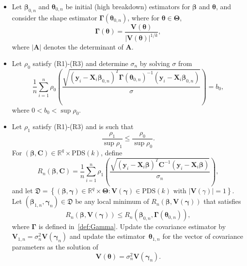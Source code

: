 \documentclass{article}
\numberwithin{equation}{section}
\theoremstyle{plain}
\newcommand{\R}{\mathbb{R}}
\newcommand{\bbeta}{\bm\beta}
\newcommand{\btheta}{\bm\theta}
\newcommand{\bgamma}{\bm\gamma}
\newcommand{\bGamma}{\bm\Gamma}
\newcommand{\bTheta}{\bm\Theta}
\newcommand{\by}{\mathbf{y}}
\newcommand{\bX}{\mathbf{X}}
\newcommand{\bV}{\mathbf{V}}
\newcommand{\bA}{\mathbf{A}}
\newcommand{\bC}{\mathbf{C}}
\begin{document}
\begin{itemize}
\item[STAGE 1:]
Let $\bbeta_{0,n}$ and $\btheta_{0,n}$ be initial (high breakdown) estimators for $\bbeta$ and $\btheta$,
and consider the shape estimator $\bGamma(\btheta_{0,n})$, where for $\btheta\in\bTheta$,
\begin{equation}
\label{def:Gamma}
\bGamma(\btheta)
=
\frac{\bV(\btheta)}{|\bV(\btheta)|^{1/k}},
\end{equation}
where $|\bA|$ denotes the determinant of $\bA$.
\item[STAGE 2:]
Let $\rho_0$ satisfy (R1)-(R3) and
determine $\sigma_n$ by solving $\sigma$ from
\begin{equation}
\label{def:initial estimators}
\frac{1}{n}
\sum_{i=1}^n
\rho_0
\left(
\frac{\displaystyle\sqrt{(\by_i-\bX_i\bbeta_{0,n})^T
\bGamma(\btheta_{0,n})^{-1}
(\by_i-\bX_i\bbeta_{0,n})}}{\sigma}
\right)
=
b_0,
\end{equation}
where $0<b_0<\sup\rho_0$.
\item[STAGE 3:]
Let $\rho_1$ satisfy (R1)-(R3) and is such that
\begin{equation}
\label{eq:ineq rho functions}
\frac{\rho_1}{\sup\rho_1}\leq \frac{\rho_0}{\sup\rho_0}.
\end{equation}
For $(\bbeta,\bC)\in\R^q\times\text{PDS}(k)$, define
\begin{equation}
\label{def:Rn}
R_{n}(\bbeta,\bC)
=
\frac1n
\sum_{i=1}^{n}
\rho_1\left(
\frac{\displaystyle\sqrt{(\by_i-\bX_i\bbeta)^T\bC^{-1}(\by_i-\bX_i\bbeta)}}{\sigma_n}
\right),
\end{equation}
and let
$\mathfrak{D}
=
\left\{
(\bbeta,\bgamma)\in\R^q\times\bTheta:\bV(\bgamma)\in\text{PDS}(k)\text{ with }|\bV(\gamma)|=1
\right\}$.
Let $(\bbeta_{1,n},\bgamma_n)\in \mathfrak{D}$ be any local minimum of
$R_{n}(\bbeta,\bV(\bgamma))$
that satisfies
\begin{equation}
\label{eq:ineq Rn}
R_{n}(\bbeta,\bV(\bgamma))
\leq
R_{n}(\bbeta_{0,n},\bGamma(\btheta_{0,n})),
\end{equation}
where $\bGamma$ is defined in~\eqref{def:Gamma}.
Update the covariance estimator by $\bV_{1,n}=\sigma_n^2\bV(\bgamma_n)$
and update the estimator~$\btheta_{1,n}$ for the vector of covariance parameters as the solution of
\begin{equation}
\label{eq:update theta}
\bV(\btheta)=\sigma_n^2\bV(\bgamma_n).
\end{equation}
\end{itemize}
\end{document}
